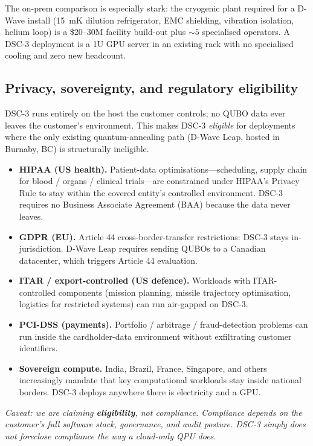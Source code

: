 \documentclass[11pt,a4paper]{article}
\begin{document}
The on-prem comparison is especially stark: the cryogenic plant
required for a D-Wave install (15~mK dilution refrigerator, EMC
shielding, vibration isolation, helium loop) is a \$20--30M facility
build-out plus $\sim 5$ specialised operators. A DSC-3 deployment is a
1U GPU server in an existing rack with no specialised cooling and zero
new headcount.

\subsection{Privacy, sovereignty, and regulatory eligibility}
\label{sec:privacy}

DSC-3 runs entirely on the host the customer controls; no QUBO data
ever leaves the customer's environment. This makes DSC-3 \emph{eligible}
for deployments where the only existing quantum-annealing path
(D-Wave Leap, hosted in Burnaby, BC) is structurally ineligible.

\begin{itemize}\itemsep0.15em
\item[$\bullet$] \textbf{HIPAA (US health).} Patient-data
  optimisations---scheduling, supply chain for blood / organs / clinical
  trials---are constrained under HIPAA's Privacy Rule to stay within
  the covered entity's controlled environment. DSC-3 requires no
  Business Associate Agreement (BAA) because the data never leaves.
\item[$\bullet$] \textbf{GDPR (EU).} Article 44 cross-border-transfer
  restrictions: DSC-3 stays in-jurisdiction. D-Wave Leap requires
  sending QUBOs to a Canadian datacenter, which triggers Article 44
  evaluation.
\item[$\bullet$] \textbf{ITAR / export-controlled (US defence).}
  Workloads with ITAR-controlled components (mission planning, missile
  trajectory optimisation, logistics for restricted systems) can run
  air-gapped on DSC-3.
\item[$\bullet$] \textbf{PCI-DSS (payments).} Portfolio / arbitrage /
  fraud-detection problems can run inside the cardholder-data
  environment without exfiltrating customer identifiers.
\item[$\bullet$] \textbf{Sovereign compute.} India, Brazil, France,
  Singapore, and others increasingly mandate that key computational
  workloads stay inside national borders. DSC-3 deploys anywhere there
  is electricity and a GPU.
\end{itemize}

\emph{Caveat: we are claiming \textbf{eligibility}, not compliance.
Compliance depends on the customer's full software stack, governance,
and audit posture. DSC-3 simply does not foreclose compliance the way a
cloud-only QPU does.}
\end{document}
